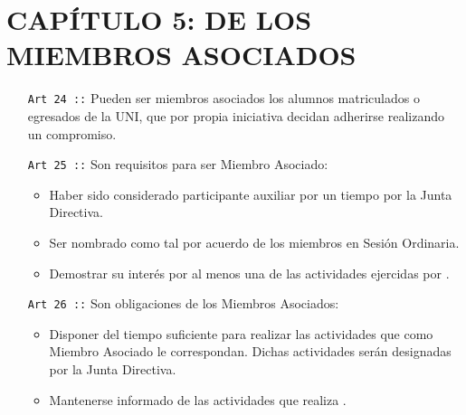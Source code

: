 \section*{CAPÍTULO 5: DE LOS MIEMBROS ASOCIADOS}
\begin{itemize}
  \item [\texttt{Art 24 ::}] Pueden ser miembros asociados los alumnos matriculados o egresados de la UNI,
  que por propia iniciativa decidan adherirse realizando un compromiso.
  \item [\texttt{Art 25 ::}]  Son requisitos para ser Miembro Asociado:
  \begin{itemize}
    \item Haber sido considerado participante auxiliar por un tiempo por la Junta Directiva.
    \item Ser nombrado como tal por acuerdo de los miembros en Sesión Ordinaria.
    \item Demostrar su interés por al menos una de las actividades ejercidas por \flae.

  \end{itemize}
  \item [\texttt{Art 26 ::}] Son obligaciones de los Miembros Asociados:
  \begin{itemize}
    \item Disponer del tiempo suficiente para realizar las actividades que como Miembro Asociado le correspondan. Dichas actividades serán designadas por la Junta Directiva.
    \item Mantenerse informado de las actividades que realiza \flae.
  \end{itemize}

\end{itemize}

